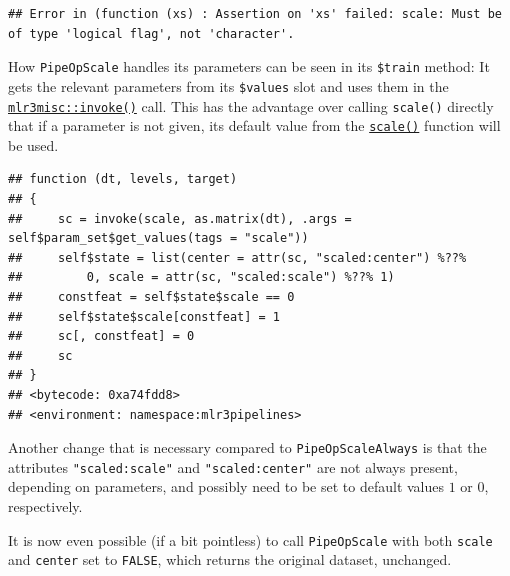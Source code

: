\documentclass[]{article}
\newenvironment{Shaded}{\begin{snugshade}}{\end{snugshade}}
\newcommand{\DecValTok}[1]{\textcolor[rgb]{0.00,0.00,0.81}{#1}}
\newcommand{\KeywordTok}[1]{\textcolor[rgb]{0.13,0.29,0.53}{\textbf{#1}}}
\newcommand{\NormalTok}[1]{#1}
\newcommand{\OperatorTok}[1]{\textcolor[rgb]{0.81,0.36,0.00}{\textbf{#1}}}
\newcommand{\OtherTok}[1]{\textcolor[rgb]{0.56,0.35,0.01}{#1}}
\newcommand{\StringTok}[1]{\textcolor[rgb]{0.31,0.60,0.02}{#1}}
\renewenvironment{Shaded} {\begin{snugshade}\small} {\end{snugshade}}
\begin{document}
\begin{verbatim}
## Error in (function (xs) : Assertion on 'xs' failed: scale: Must be of type 'logical flag', not 'character'.
\end{verbatim}

How \texttt{PipeOpScale} handles its parameters can be seen in its \texttt{\$train} method: It gets the relevant parameters from its \texttt{\$values} slot and uses them in the \href{https://mlr3misc.mlr-org.com/reference/invoke.html}{\texttt{mlr3misc::invoke()}} call.
This has the advantage over calling \texttt{scale()} directly that if a parameter is not given, its default value from the \href{https://www.rdocumentation.org/packages/base/topics/scale}{\texttt{scale()}} function will be used.

\begin{Shaded}
\end{Shaded}

\begin{verbatim}
## function (dt, levels, target) 
## {
##     sc = invoke(scale, as.matrix(dt), .args = self$param_set$get_values(tags = "scale"))
##     self$state = list(center = attr(sc, "scaled:center") %??% 
##         0, scale = attr(sc, "scaled:scale") %??% 1)
##     constfeat = self$state$scale == 0
##     self$state$scale[constfeat] = 1
##     sc[, constfeat] = 0
##     sc
## }
## <bytecode: 0xa74fdd8>
## <environment: namespace:mlr3pipelines>
\end{verbatim}

Another change that is necessary compared to \texttt{PipeOpScaleAlways} is that the attributes \texttt{"scaled:scale"} and \texttt{"scaled:center"} are not always present, depending on parameters, and possibly need to be set to default values \(1\) or \(0\), respectively.

It is now even possible (if a bit pointless) to call \texttt{PipeOpScale} with both \texttt{scale} and \texttt{center} set to \texttt{FALSE}, which returns the original dataset, unchanged.

\begin{Shaded}
\end{Shaded}
\end{document}
